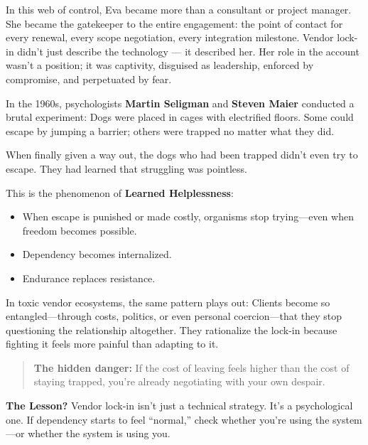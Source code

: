 In this web of control, Eva became more than a consultant or project manager. She became the gatekeeper to the entire engagement: the point of contact for every renewal, every scope negotiation, every integration milestone. Vendor lock-in didn’t just describe the technology --- it described her. Her role in the account wasn’t a position; it was captivity, disguised as leadership, enforced by compromise, and perpetuated by fear.

\medskip

\begin{tcolorbox}[colback=blue!5!white, colframe=blue!50!black, breakable,
  title={Psychological Sidebar: Learned Helplessness — When Escape Costs More Than Staying}]

In the 1960s, psychologists \textbf{Martin Seligman} and \textbf{Steven Maier} conducted a brutal experiment:  
Dogs were placed in cages with electrified floors.  
Some could escape by jumping a barrier; others were trapped no matter what they did.

\medskip

When finally given a way out, the dogs who had been trapped didn’t even try to escape.  
They had learned that struggling was pointless.

\medskip

This is the phenomenon of \textbf{Learned Helplessness}:
\begin{itemize}
    \item When escape is punished or made costly, organisms stop trying—even when freedom becomes possible.
    \item Dependency becomes internalized.
    \item Endurance replaces resistance.
\end{itemize}

\medskip

In toxic vendor ecosystems, the same pattern plays out:  
Clients become so entangled—through costs, politics, or even personal coercion—that they stop questioning the relationship altogether.  
They rationalize the lock-in because fighting it feels more painful than adapting to it.

\medskip

\begin{quote}
\textbf{The hidden danger:} If the cost of leaving feels higher than the cost of staying trapped, you're already negotiating with your own despair.
\end{quote}

\medskip

\textbf{The Lesson?} Vendor lock-in isn’t just a technical strategy. It’s a psychological one. If dependency starts to feel “normal,” check whether you’re using the system—or whether the system is using you.
\end{tcolorbox}



